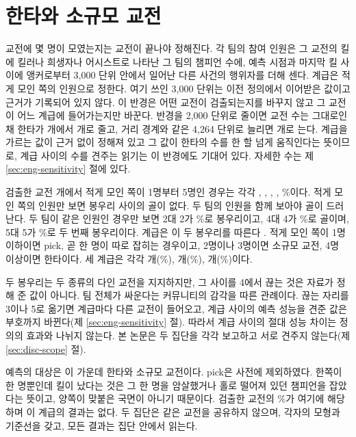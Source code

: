 \section{한타와 소규모 교전}
\label{sec:eng-scale}

교전에 몇 명이 모였는지는 교전이 끝나야 정해진다. 각 팀의 참여 인원은 그 교전의 킬에 킬러나 희생자나 어시스트로 나타난 그 팀의 챔피언 수에, 예측 시점과 마지막 킬 사이에 앵커로부터 3{,}000 단위 안에서 일어난 다른 사건의 행위자를 더해 센다. 계급은 적게 모인 쪽의 인원으로 정한다. 여기 쓰인 3{,}000 단위는 이전 정의에서 이어받은 값이고 근거가 기록되어 있지 않다. 이 반경은 어떤 교전이 검출되는지를 바꾸지 않고 그 교전이 어느 계급에 들어가는지만 바꾼다. 반경을 2{,}000 단위로 줄이면 교전 수는 그대로인 채 한타가 \oatRefT{}개에서 \oatItwoT{}개로 줄고, 거리 경계와 같은 4{,}264 단위로 늘리면 \oatIfourdT{}개로 는다. 계급을 가르는 값이 근거 없이 정해져 있고 그 값이 한타의 수를 한 할 넘게 움직인다는 뜻이므로, 계급 사이의 수를 견주는 읽기는 이 반경에도 기대어 있다. 자세한 수는 제 \ref{sec:eng-sensitivity} 절에 있다.

검출한 교전 \numEngDetected{}개에서 적게 모인 쪽이 1명부터 5명인 경우는 각각 \censusNminOne{}, \censusNminTwo{}, \censusNminThree{}, \censusNminFour{}, \censusNminFive{}\%이다. 적게 모인 쪽의 인원만 보면 봉우리 사이의 골이 없다. 두 팀의 인원을 함께 보아야 골이 드러난다. 두 팀이 같은 인원인 경우만 보면 2대 2가 \censusTwoTwo{}\%로 봉우리이고, 4대 4가 \censusFourFour{}\%로 골이며, 5대 5가 \censusFiveFive{}\%로 두 번째 봉우리이다. 계급은 이 두 봉우리를 따른다 \cite{berman2014mapping}. 적게 모인 쪽이 1명 이하이면 pick, 곧 한 명이 따로 잡히는 경우이고, 2명이나 3명이면 소규모 교전, 4명 이상이면 한타이다. 세 계급은 각각 \censusP{}개(\censusShareP{}\%), \censusS{}개(\censusShareS{}\%), \censusT{}개(\censusShareT{}\%)이다.

두 봉우리는 두 종류의 다인 교전을 지지하지만, 그 사이를 4에서 끊는 것은 자료가 정해 준 값이 아니다. 팀 전체가 싸운다는 커뮤니티의 감각을 따른 관례이다. 끊는 자리를 3이나 5로 옮기면 계급마다 다른 교전이 들어오고, 계급 사이의 예측 성능을 견준 값은 부호까지 바뀐다(제 \ref{sec:eng-sensitivity} 절). 따라서 계급 사이의 절대 성능 차이는 정의의 효과와 나뉘지 않는다. 본 논문은 두 집단을 각각 보고하고 서로 견주지 않는다(제 \ref{sec:disc-scope} 절).

예측의 대상은 이 가운데 한타와 소규모 교전이다. pick은 사전에 제외하였다. 한쪽이 한 명뿐인데 킬이 났다는 것은 그 한 명을 암살했거나 홀로 떨어져 있던 챔피언을 잡았다는 뜻이고, 양쪽이 맞붙은 국면이 아니기 때문이다. 검출한 교전의 \censusShareP{}\%가 여기에 해당하며 이 계급의 결과는 없다. 두 집단은 같은 교전을 공유하지 않으며, 각자의 모형과 기준선을 갖고, 모든 결과는 집단 안에서 읽는다.


